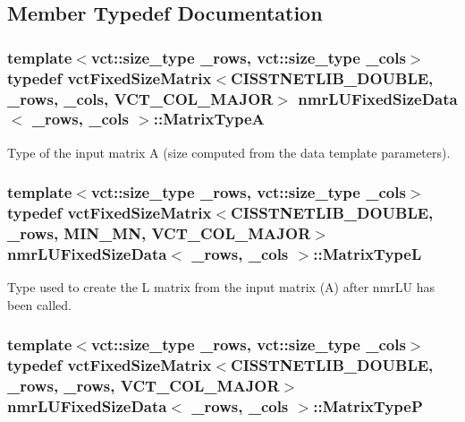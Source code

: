 \subsection{Member Typedef Documentation}
\hypertarget{classnmr_l_u_fixed_size_data_aecd74a0eb81f7dae537d4cce15781210}{
\subsubsection[{Matrix\-Type\-A}]{\setlength{\rightskip}{0pt plus 5cm}template$<$vct\-::size\-\_\-type \-\_\-rows, vct\-::size\-\_\-type \-\_\-cols$>$ typedef {\bf vct\-Fixed\-Size\-Matrix}$<$C\-I\-S\-S\-T\-N\-E\-T\-L\-I\-B\-\_\-\-D\-O\-U\-B\-L\-E, \-\_\-rows, \-\_\-cols, {\bf V\-C\-T\-\_\-\-C\-O\-L\-\_\-\-M\-A\-J\-O\-R}$>$ {\bf nmr\-L\-U\-Fixed\-Size\-Data}$<$ \-\_\-rows, \-\_\-cols $>$\-::{\bf Matrix\-Type\-A}}}\label{classnmr_l_u_fixed_size_data_aecd74a0eb81f7dae537d4cce15781210}
Type of the input matrix A (size computed from the data template parameters). \hypertarget{classnmr_l_u_fixed_size_data_a6bf3bc7a9257ec14a9a47f6144fdbb4c}{
\subsubsection[{Matrix\-Type\-L}]{\setlength{\rightskip}{0pt plus 5cm}template$<$vct\-::size\-\_\-type \-\_\-rows, vct\-::size\-\_\-type \-\_\-cols$>$ typedef {\bf vct\-Fixed\-Size\-Matrix}$<$C\-I\-S\-S\-T\-N\-E\-T\-L\-I\-B\-\_\-\-D\-O\-U\-B\-L\-E, \-\_\-rows, {\bf M\-I\-N\-\_\-\-M\-N}, {\bf V\-C\-T\-\_\-\-C\-O\-L\-\_\-\-M\-A\-J\-O\-R}$>$ {\bf nmr\-L\-U\-Fixed\-Size\-Data}$<$ \-\_\-rows, \-\_\-cols $>$\-::{\bf Matrix\-Type\-L}}}\label{classnmr_l_u_fixed_size_data_a6bf3bc7a9257ec14a9a47f6144fdbb4c}
Type used to create the L matrix from the input matrix (A) after nmr\-L\-U has been called. \hypertarget{classnmr_l_u_fixed_size_data_aba187a86e2a881d8327e56bdbc87b159}{
\subsubsection[{Matrix\-Type\-P}]{\setlength{\rightskip}{0pt plus 5cm}template$<$vct\-::size\-\_\-type \-\_\-rows, vct\-::size\-\_\-type \-\_\-cols$>$ typedef {\bf vct\-Fixed\-Size\-Matrix}$<$C\-I\-S\-S\-T\-N\-E\-T\-L\-I\-B\-\_\-\-D\-O\-U\-B\-L\-E, \-\_\-rows, \-\_\-rows, {\bf V\-C\-T\-\_\-\-C\-O\-L\-\_\-\-M\-A\-J\-O\-R}$>$ {\bf nmr\-L\-U\-Fixed\-Size\-Data}$<$ \-\_\-rows, \-\_\-cols $>$\-::{\bf Matrix\-Type\-P}}}\label{classnmr_l_u_fixed_size_data_aba187a86e2a881d8327e56bdbc87b159}
